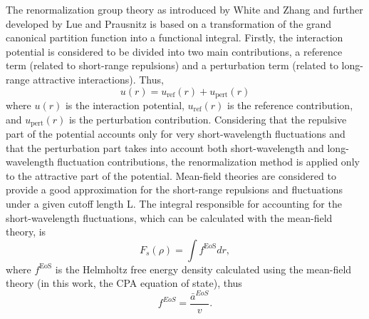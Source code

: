 \documentclass[preprint,12pt,3p]{elsarticle}
\begin{document}
	The renormalization group theory as introduced by White and Zhang \cite{white1993renormalization} and further developed by Lue and Prausnitz \cite{lue1998renormalization,lue1998brenormalization} is based on a transformation of the grand canonical partition function into a functional integral. Firstly, the interaction potential is considered to be divided into two main contributions, a reference term (related to short-range repulsions) and a perturbation term (related to long-range attractive interactions). Thus,
\begin{equation} \label{eq:u(r)}
    u(r) = u_\text{ref}(r) + u_\text{pert}(r)
\end{equation}
    where $u(r)$ is the interaction potential, $u_\text{ref}(r)$ is the reference contribution, and $u_\text{pert}(r)$ is the perturbation contribution. Considering that the repulsive part of the potential accounts only for very short-wavelength fluctuations and that the perturbation part takes into account both short-wavelength and long-wavelength fluctuation contributions, the renormalization method is applied only to the attractive part of the potential. Mean-field theories are considered to provide a good approximation for the short-range repulsions and fluctuations under a given cutoff length L. The integral responsible for accounting for the short-wavelength fluctuations, which can be calculated with the mean-field theory, is
\begin{equation} \label{eq:Fs}
    F_{s}(\rho) = \int f^\text{EoS} dr,
\end{equation}
	where $f^\text{EoS}$ is the Helmholtz free energy density calculated using the mean-field theory (in this work, the CPA equation of state), thus
\begin{equation} \label{eq:f_to_a}
    f^{EoS} = \frac{\bar{a}^{EoS}}{v}.
\end{equation}
    
\end{document}
